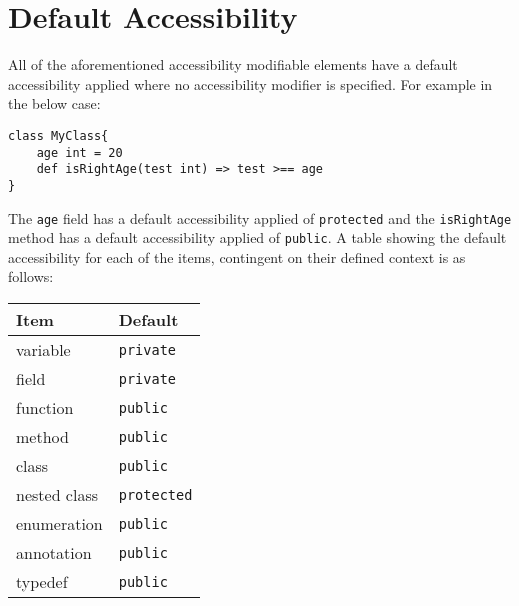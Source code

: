 \documentclass[conc-doc]{subfiles}
\begin{document}
\section{Default Accessibility}
All of the aforementioned accessibility modifiable elements have a default accessibility applied where no accessibility modifier is specified. For example in the below case:
\begin{lstlisting}
class MyClass{
	age int = 20
	def isRightAge(test int) => test >== age
}
\end{lstlisting}

The \lstinline{age} field has a default accessibility applied of \lstinline{protected} and the \lstinline{isRightAge} method has a default accessibility applied of \lstinline{public}. A table showing the default accessibility for each of the items, contingent on their defined context is as follows:

\begin{table}[H]
	\centering
	\begin{tabular}{ll}
		\hline
		Item&Default\\
		\hline
		variable&\lstinline!private!\\
		field&\lstinline!private!\\
		function&\lstinline!public!\\
		method&\lstinline!public!\\
		class&\lstinline!public!\\
		nested class&\lstinline!protected!\\
		enumeration&\lstinline!public!\\
		annotation&\lstinline!public!\\
		typedef&\lstinline!public!\\
		\hline
	\end{tabular}%
\end{table}
\end{document}
